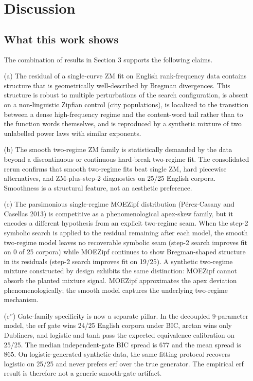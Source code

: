 \documentclass[11pt]{article}
\begin{document}
\section{Discussion}\label{sec:discussion}

\subsection{What this work shows}

The combination of results in Section 3 supports the following claims.

(a) The residual of a single-curve ZM fit on English rank-frequency data contains structure that is geometrically well-described by Bregman divergences. This structure is robust to multiple perturbations of the search configuration, is absent on a non-linguistic Zipfian control (city populations), is localized to the transition between a dense high-frequency regime and the content-word tail rather than to the function words themselves, and is reproduced by a synthetic mixture of two unlabelled power laws with similar exponents.

(b) The smooth two-regime ZM family is statistically demanded by the data beyond a discontinuous or continuous hard-break two-regime fit. The consolidated rerun confirms that smooth two-regime fits beat single ZM, hard piecewise alternatives, and ZM-plus-step-2 diagnostics on 25/25 English corpora. Smoothness is a structural feature, not an aesthetic preference.

(c) The parsimonious single-regime MOEZipf distribution (Pérez-Casany and Casellas 2013) is competitive as a phenomenological apex-skew family, but it encodes a different hypothesis from an explicit two-regime seam. When the step-2 symbolic search is applied to the residual remaining after each model, the smooth two-regime model leaves no recoverable symbolic seam (step-2 search improves fit on 0 of 25 corpora) while MOEZipf continues to show Bregman-shaped structure in its residuals (step-2 search improves fit on 19/25). A synthetic two-regime mixture constructed by design exhibits the same distinction: MOEZipf cannot absorb the planted mixture signal. MOEZipf approximates the apex deviation phenomenologically; the smooth model captures the underlying two-regime mechanism.

(c'') Gate-family specificity is now a separate pillar. In the decoupled 9-parameter model, the erf gate wins 24/25 English corpora under BIC, arctan wins only Dubliners, and logistic and tanh pass the expected equivalence calibration on 25/25. The median independent-gate BIC spread is 677 and the mean spread is 865. On logistic-generated synthetic data, the same fitting protocol recovers logistic on 25/25 and never prefers erf over the true generator. The empirical erf result is therefore not a generic smooth-gate artifact.
\end{document}

